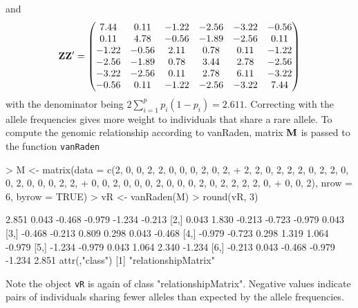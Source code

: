 \documentclass[a4paper,11pt]{article}
\begin{document}
  and 
  $$ \bf Z \bf Z ' = \begin{pmatrix}  
   7.44 & 0.11 & -1.22 & -2.56 & -3.22 & -0.56 \\ 
   0.11 & 4.78 & -0.56 & -1.89 & -2.56 & 0.11 \\ 
   -1.22 & -0.56 & 2.11 & 0.78 & 0.11 & -1.22 \\ 
   -2.56 & -1.89 & 0.78 & 3.44 & 2.78 & -2.56 \\ 
   -3.22 & -2.56 & 0.11 & 2.78 & 6.11 & -3.22 \\ 
   -0.56 & 0.11 & -1.22 & -2.56 & -3.22 & 7.44 \\
     \end{pmatrix}
  $$                                                                                   
with the denominator being $2\sum_{i=1}^p p_i(1-p_i)=2.611$. Correcting with the allele frequencies gives more weight to individuals that share a rare allele. To compute the genomic relationship according to vanRaden, matrix $\bf M$ is passed to the function \texttt{vanRaden}  
\begin{Schunk}
\begin{Sinput}
> M <- matrix(data = c(2, 0, 0, 2, 2, 0, 0, 0, 2, 0, 2, 
+     2, 2, 0, 2, 2, 2, 0, 2, 2, 0, 0, 2, 0, 0, 0, 2, 2, 
+     0, 0, 2, 0, 0, 0, 2, 0, 0, 0, 2, 0, 2, 2, 2, 2, 0, 
+     0, 0, 2), nrow = 6, byrow = TRUE)
> vR <- vanRaden(M)
> round(vR, 3)
\end{Sinput}
\begin{Soutput}
       [,1]   [,2]   [,3]   [,4]   [,5]   [,6]
[1,]  2.851  0.043 -0.468 -0.979 -1.234 -0.213
[2,]  0.043  1.830 -0.213 -0.723 -0.979  0.043
[3,] -0.468 -0.213  0.809  0.298  0.043 -0.468
[4,] -0.979 -0.723  0.298  1.319  1.064 -0.979
[5,] -1.234 -0.979  0.043  1.064  2.340 -1.234
[6,] -0.213  0.043 -0.468 -0.979 -1.234  2.851
attr(,"class")
[1] "relationshipMatrix"
\end{Soutput}
\end{Schunk}
Note the object \texttt{vR} is again of class "relationshipMatrix". Negative values indicate pairs of individuals sharing fewer alleles than expected by the allele frequencies.   
\end{document}
